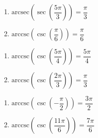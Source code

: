 \documentclass{ximera}
\begin{document}
\begin{multicols}{2}

\begin{enumerate}

\setcounter{enumi}{\value{HW}}

\item  $\text{arcsec}\left(\sec\left(\dfrac{5\pi}{3}\right) \right) = \dfrac{\pi}{3}$
\item  $\text{arccsc}\left(\csc\left(\dfrac{\pi}{6}\right) \right) = \dfrac{\pi}{6}$ 

\setcounter{HW}{\value{enumi}}

\end{enumerate}

\end{multicols}

\begin{multicols}{2}

\begin{enumerate}

\setcounter{enumi}{\value{HW}}

\item  $\text{arccsc}\left(\csc\left(\dfrac{5\pi}{4}\right) \right) = \dfrac{5\pi}{4}$
\item  $\text{arccsc}\left(\csc\left( \dfrac{2\pi}{3} \right) \right) = \dfrac{\pi}{3}$

\setcounter{HW}{\value{enumi}}

\end{enumerate}

\end{multicols}

\begin{multicols}{2}

\begin{enumerate}

\setcounter{enumi}{\value{HW}}

\item  $\text{arccsc}\left(\csc\left(-\dfrac{\pi}{2} \right) \right) = \dfrac{3\pi}{2}$ 
\item  $\text{arccsc}\left(\csc\left(\dfrac{11\pi}{6}\right) \right) = \dfrac{7\pi}{6}$

\setcounter{HW}{\value{enumi}}

\end{enumerate}

\end{multicols}
\end{document}
